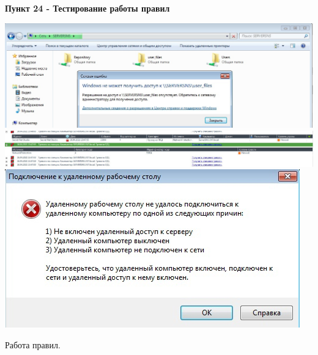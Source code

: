\documentclass[a4paper,14pt]{extarticle}
\begin{document}
    \newpage
    \textbf{Пункт 24 - Тестирование работы правил}
    \begin{center}
        \includegraphics[scale=0.35]{pics/24_1.jpg}\\
        \vspace{2ex}
        \includegraphics[scale=0.25]{pics/24_2.jpg}\\
        \vspace{2ex}
        \includegraphics[scale=0.6]{pics/24_3.jpg}

        Работа правил.
    \end{center}
\end{document}
